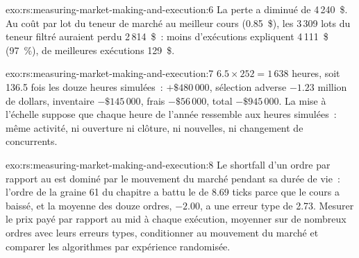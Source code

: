 \begin{solution}{exo:rs:measuring-market-making-and-execution:6}
La perte a diminué de 4\,240~\$. Au coût par lot du teneur de marché au meilleur cours (0.85~\$), les 3\,309 lots du teneur filtré auraient perdu 2\,814~\$~: moins d'exécutions
expliquent 4\,111~\$ (97~\%), de meilleures exécutions 129~\$.
\end{solution}

\begin{solution}{exo:rs:measuring-market-making-and-execution:7}
$6.5 \times 252 = 1\,638$ heures, soit 136.5 fois les douze heures simulées~:  $+\$480\,000$, sélection adverse $-1.23$ million de dollars, inventaire $-\$145\,000$, frais
$-\$56\,000$, total $-\$945\,000$. La mise à l'échelle suppose que chaque heure de l'année ressemble aux heures simulées~: même activité, ni ouverture ni clôture, ni nouvelles, ni changement de
concurrents.
\end{solution}

\begin{solution}{exo:rs:measuring-market-making-and-execution:8}
Le shortfall d'un ordre par rapport au  est dominé par le mouvement du marché pendant sa durée de vie~: l'ordre de la graine 61 du chapitre a battu le  de 8.69 ticks parce que le cours a baissé, et la moyenne des douze ordres, $-2.00$, a une erreur type de 2.73. Mesurer le prix payé par rapport au mid à chaque
exécution, moyenner sur de nombreux ordres avec leurs erreurs types, conditionner au mouvement du marché et comparer les algorithmes par expérience randomisée.
\end{solution}

